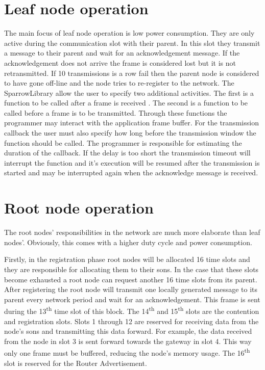 \section{Leaf node operation}

The main focus of leaf node operation is low power consumption. They are only
active during the communication slot with their parent. In this slot they
transmit a message to their parent and wait for an acknowledgement message. If
the acknowledgement does not arrive the frame is considered lost but it is not
retransmitted. If 10 transmissions is a row fail then the parent node is
considered to have gone off-line and the node tries to re-register to the
network. The SparrowLibrary allow the user to specify two additional
activities. The first is a function to be called after a frame is received .
The second is a function to be called before a frame is to be transmitted.
Through these functions the programmer may interact with the application frame
buffer. For the transmission callback the user must also specify how long
before the transmission window the function should be called. The programmer is
responsible for estimating the duration of the callback. If the delay is too
short the transmission timeout will interrupt the function and it's execution
will be resumed after the transmission is started and may be interrupted again
when the acknowledge message is received.

\section{Root node operation}

The root nodes' responsibilities in the network are much more elaborate than
leaf nodes'. Obviously, this comes with a higher duty cycle and power
consumption. 

Firstly, in the registration phase root nodes will be allocated 16 time slots
and they are responsible for allocating them to their sons. In the case that
these slots become exhausted a root node can request another 16 time slots from
its parent. After registering the root node will transmit one locally generated
message to its parent every network period and wait for an acknowledgement.
This frame is sent during the 13\textsuperscript{th} time slot of this block.
The 14\textsuperscript{th} and 15\textsuperscript{th} slots are the contention
and registration slots. Slots 1 through 12 are reserved for receiving data from
the node's sons and transmitting this data forward. For example, the data
received from the node in slot 3 is sent forward towards the gateway in slot 4.
This way only one frame must be buffered, reducing the node's memory usage. The
16\textsuperscript{th} slot is reserved for the Router Advertisement.

